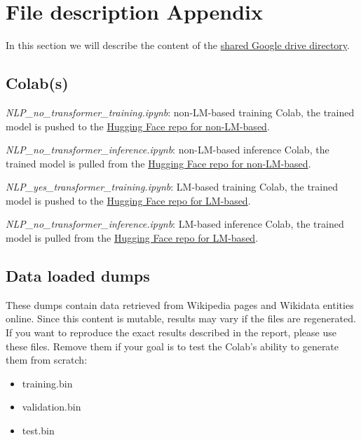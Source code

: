 \documentclass[11pt]{article}
\begin{document}
	\section{File description Appendix}
	\label{sec:appendix}
	
	In this section we will describe the content of the \href{https://drive.google.com/drive/folders/1t5pgHkdenMFPdKqQweiFl8vhIAaiVFTM?usp=drive_link}{shared Google drive directory}.
	
	\subsection{Colab(s)}
	
	\emph{NLP\_no\_transformer\_training.ipynb}: non-LM-based training Colab, the trained model is pushed to the
	\href{https://huggingface.co/fax4ever/culturalitems-no-transformer}{Hugging Face repo for non-LM-based}.
	
	\noindent \emph{NLP\_no\_transformer\_inference.ipynb}: non-LM-based inference Colab, the trained model is pulled from the
	\href{https://huggingface.co/fax4ever/culturalitems-no-transformer}{Hugging Face repo for non-LM-based}.
	
	\noindent \emph{NLP\_yes\_transformer\_training.ipynb}: LM-based training Colab, the trained model is pushed to the
	\href{https://huggingface.co/fax4ever/culturalitems-roberta-base}{Hugging Face repo for LM-based}.
	
	\noindent \emph{NLP\_no\_transformer\_inference.ipynb}: LM-based inference Colab, the trained model is pulled from the
	\href{https://huggingface.co/fax4ever/culturalitems-roberta-base}{Hugging Face repo for LM-based}.
	
	\subsection{Data loaded dumps}

	These dumps contain data retrieved from Wikipedia pages and Wikidata entities online. 
	Since this content is mutable, results may vary if the files are regenerated. 
	If you want to reproduce the exact results described in the report, please use these files. 
	Remove them if your goal is to test the Colab’s ability to generate them from scratch:
	
	 \begin{itemize}
	 	\item training.bin
	 	\item validation.bin
	 	\item test.bin
	 \end{itemize}
	 
\end{document}
